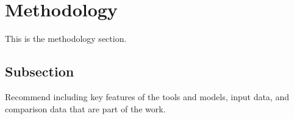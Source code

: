 \section{Methodology}
This is the methodology section.

\pagebreak
\subsection{Subsection}
Recommend including key features of the tools and models, input data, and 
comparison data that are part of the work.
